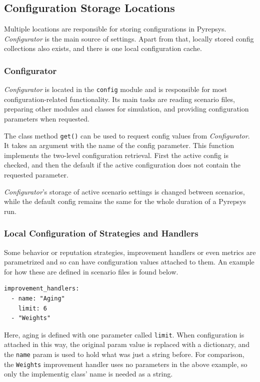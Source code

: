 \documentclass[%
    ]{\PathToTumTemplate/thesis/tum_thesis}
\begin{document}
\subsection{Configuration Storage Locations}
Multiple locations are responsible for storing configurations in Pyrepsys.
\emph{Configurator} is the main source of settings.
Apart from that, locally stored config collections also exists, and there is one local configuration cache.

\subsubsection{Configurator}
\emph{Configurator} is located in the \texttt{config} module and is responsible for most configuration-related functionality.
Its main tasks are reading scenario files, preparing other modules and classes for simulation, and providing configuration parameters when requested.

The class method \lstinline{get()} can be used to request config values from \emph{Configurator}.
It takes an argument with the name of the config parameter.
This function implements the two-level configuration retrieval.
First the active config is checked, and then the default if the active configuration does not contain the requested parameter.

\emph{Configurator}'s storage of active scenario settings is changed between scenarios, while the default config remains the same for the whole duration of a Pyrepsys run.

\subsubsection{Local Configuration of Strategies and Handlers}\label{sec:local_config}
Some behavior or reputation strategies, improvement handlers or even metrics are parametrized and so can have configuration values attached to them.
An example for how these are defined in scenario files is found below.
\begin{lstlisting}
improvement_handlers:
  - name: "Aging"
    limit: 6
  - "Weights"
\end{lstlisting}
Here, aging is defined with one parameter called \texttt{limit}.
When configuration is attached in this way, the original param value is replaced with a dictionary, and the \texttt{name} param is used to hold what was just a string before.
For comparison, the \texttt{Weights} improvement handler uses no parameters in the above example, so only the implementig class' name is needed as a string.
\end{document}
